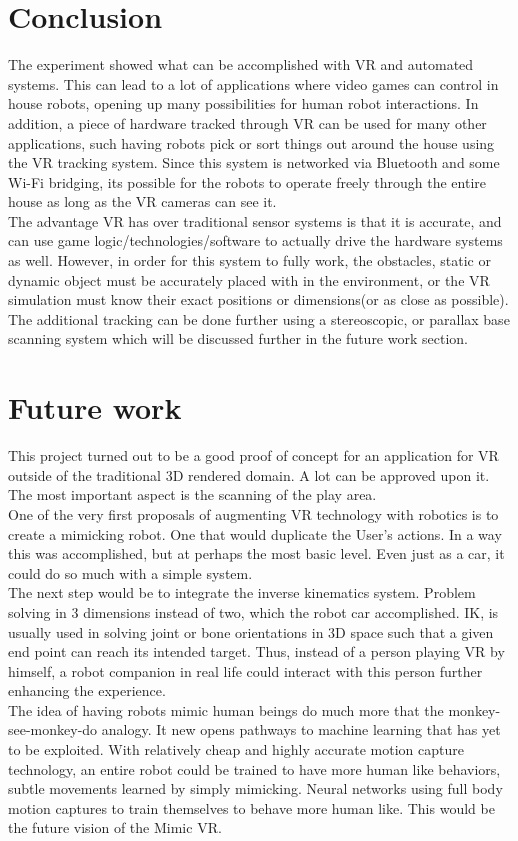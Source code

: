 \documentclass[10pt,a4paper]{article}
\begin{document}
	\section*{Conclusion}
	The experiment showed what can be accomplished with VR and automated systems. This can lead to a lot of applications where video games can control in house robots, opening up many possibilities for human robot interactions. In addition, a piece of hardware tracked through VR can be used for many other applications, such having robots pick or sort things out around the house using the VR tracking system. Since this system is networked via Bluetooth and some Wi-Fi bridging, its possible for the robots to operate freely through the entire house as long as the VR cameras can see it.
	\\
	The advantage VR has over traditional sensor systems is that it is accurate, and can use game logic/technologies/software to actually drive the hardware systems as well. However, in order for this system to fully work, the obstacles, static or dynamic object must be accurately placed with in the environment, or the VR simulation must know their exact positions or dimensions(or as close as possible).
	\\
	The additional tracking can be done further using a stereoscopic, or parallax base scanning system which will be discussed further in the future work section.
	
	\section*{Future work}
	This project turned out to be a good proof of concept for an application for VR outside of the traditional 3D rendered domain. A lot can be approved upon it. The most important aspect is the scanning of the play area. 
	\\
	One of the very first proposals of augmenting VR technology with robotics is to create a mimicking robot. One that would duplicate the User's actions. In a way this was accomplished, but at perhaps the most basic level. Even just as a car, it could do so much with a simple system.
	\\
	The next step would be to integrate the inverse kinematics system. Problem solving in 3 dimensions instead of two, which the robot car accomplished. IK, is usually used in solving joint or bone orientations in 3D space such that a given end point can reach its intended target. Thus, instead of a person playing VR by himself, a robot companion in real life could interact with this person further enhancing the experience.
	\\
	The idea of having robots mimic human beings do much more that the monkey-see-monkey-do analogy. It new opens pathways to machine learning that has yet to be exploited. With relatively cheap and highly accurate motion capture technology, an entire robot could be trained to have more human like behaviors, subtle movements learned by simply mimicking. Neural networks using full body motion captures to train themselves to behave more human like. This would be the future vision of the Mimic VR.
	
\end{document}
